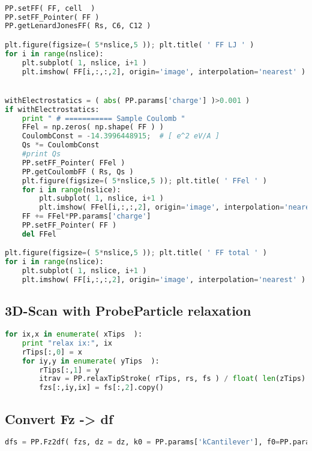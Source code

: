 \begin{shadedbox}
    \begin{lstlisting}[language=python]

PP.setFF( FF, cell  )
PP.setFF_Pointer( FF )
PP.getLenardJonesFF( Rs, C6, C12 )

plt.figure(figsize=( 5*nslice,5 )); plt.title( ' FF LJ ' )
for i in range(nslice):
    plt.subplot( 1, nslice, i+1 )
    plt.imshow( FF[i,:,:,2], origin='image', interpolation='nearest' )


withElectrostatics = ( abs( PP.params['charge'] )>0.001 )
if withElectrostatics: 
    print " # =========== Sample Coulomb "
    FFel = np.zeros( np.shape( FF ) )
    CoulombConst = -14.3996448915;  # [ e^2 eV/A ]
    Qs *= CoulombConst
    #print Qs
    PP.setFF_Pointer( FFel )
    PP.getCoulombFF ( Rs, Qs )
    plt.figure(figsize=( 5*nslice,5 )); plt.title( ' FFel ' )
    for i in range(nslice):
        plt.subplot( 1, nslice, i+1 )
        plt.imshow( FFel[i,:,:,2], origin='image', interpolation='nearest' )
    FF += FFel*PP.params['charge']
    PP.setFF_Pointer( FF )
    del FFel

plt.figure(figsize=( 5*nslice,5 )); plt.title( ' FF total ' )
for i in range(nslice):
    plt.subplot( 1, nslice, i+1 )
    plt.imshow( FF[i,:,:,2], origin='image', interpolation='nearest' )
   \end{lstlisting}
\end{shadedbox}

\subsection{3D-Scan with ProbeParticle relaxation}
\begin{shadedbox}
    \begin{lstlisting}[language=python]
for ix,x in enumerate( xTips  ):
    print "relax ix:", ix
    rTips[:,0] = x
    for iy,y in enumerate( yTips  ):
        rTips[:,1] = y
        itrav = PP.relaxTipStroke( rTips, rs, fs ) / float( len(zTips) )
        fzs[:,iy,ix] = fs[:,2].copy()
    \end{lstlisting}
\end{shadedbox}



\subsection{Convert Fz -> df}
\begin{shadedbox}
    \begin{lstlisting}[language=python]
dfs = PP.Fz2df( fzs, dz = dz, k0 = PP.params['kCantilever'], f0=PP.params['f0Cantilever'], n=int(PP.params['Amplitude']/dz) )
    \end{lstlisting}
\end{shadedbox}



